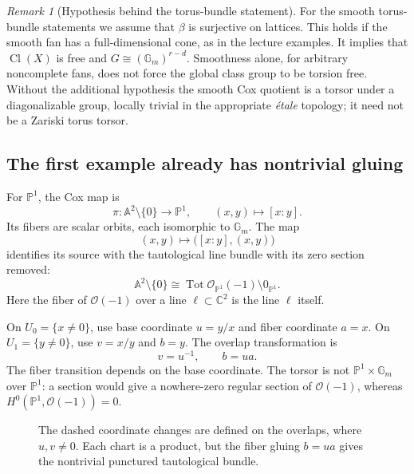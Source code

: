 \documentclass[11pt]{article}
\theoremstyle{definition}
\theoremstyle{remark}
\newtheorem{Rmk}{Remark}
\DeclareMathOperator{\Cl}{Cl}
\DeclareMathOperator{\Tot}{Tot}
\newcommand{\A}{\mathbb A}
\newcommand{\Pj}{\mathbb P}
\newcommand{\C}{\mathbb C}
\newcommand{\Gm}{\mathbb G_m}
\newcommand{\OO}{\mathcal O}
\begin{document}
\begin{Rmk}[Hypothesis behind the torus-bundle statement]
For the smooth torus-bundle statements we assume that \(\beta\) is
surjective on lattices. This holds if the smooth fan has a
full-dimensional cone, as in the lecture examples. It implies that
\(\Cl(X)\) is free and \(G\cong(\Gm)^{r-d}\).
Smoothness alone, for arbitrary noncomplete fans, does not force the
global class group to be torsion free. Without the additional
hypothesis the smooth Cox quotient is a torsor under a diagonalizable
group, locally trivial in the appropriate \emph{\'etale} topology;
it need not be a Zariski torus torsor.
\end{Rmk}

\subsection{The first example already has nontrivial gluing}

For \(\Pj^1\), the Cox map is
\[
\pi:\A^2\setminus\{0\}\longrightarrow\Pj^1,
\qquad (x,y)\longmapsto[x:y].
\]
Its fibers are scalar orbits, each isomorphic to \(\Gm\). The map
\[
(x,y)\longmapsto\bigl([x:y],(x,y)\bigr)
\]
identifies its source with the tautological line bundle with its
zero section removed:
\[
\boxed{\A^2\setminus\{0\}
 \cong\Tot\OO_{\Pj^1}(-1)\setminus0_{\Pj^1}.}
\]
Here the fiber of \(\OO(-1)\) over a line \(\ell\subset\C^2\)
is the line \(\ell\) itself.

On \(U_0=\{x\ne0\}\), use base coordinate \(u=y/x\) and fiber
coordinate \(a=x\). On \(U_1=\{y\ne0\}\), use \(v=x/y\) and
\(b=y\). The overlap transformation is
\[
\boxed{v=u^{-1},\qquad b=ua.}
\]
The fiber transition depends on the base coordinate. The torsor is
not \(\Pj^1\times\Gm\) over \(\Pj^1\): a section would give a
nowhere-zero regular section of \(\OO(-1)\), whereas
\(H^0(\Pj^1,\OO(-1))=0\).

\begin{figure}[htbp]
\centering
{}
\caption{The dashed coordinate changes are defined on the overlaps,
where \(u,v\ne0\). Each chart is a product, but the fiber gluing
\(b=ua\) gives the nontrivial punctured tautological bundle.}
\label{fig:nov02-torsor-gluing}
\end{figure}
\end{document}
